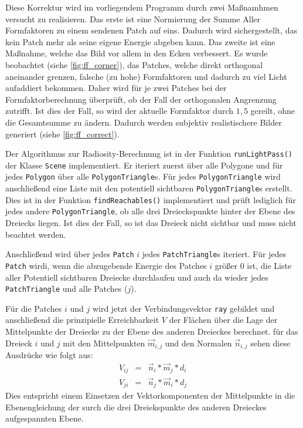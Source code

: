 \documentclass[final,a4paper,11pt,notitlepage,halfparskip]{scrreprt}
\begin{document}
Diese Korrektur wird im vorliegendem Programm durch zwei Maßnamhmen versucht zu
realisieren. Das erste ist eine Normierung der Summe Aller Formfaktoren zu einem
sendenen Patch auf eins. Dadurch wird sichergestellt, das kein Patch mehr als
seine eigene Energie abgeben kann. Das zweite ist eine Maßnahme, welche das Bild
vor allem in den Ecken verbessert. Es wurde beobachtet (siehe \ref{fig:ff_corner}), 
das Patches, welche direkt orthogonal aneinander grenzen, falsche (zu hohe) 
Formfaktoren und dadurch zu viel Licht aufaddiert bekommen. Daher wird für je
zwei Patches bei der Formfaktorberechnung überprüft, ob der Fall der
orthogonalen Angrenzung zutrifft. Ist dies der Fall, so wird der aktuelle
Formfaktor durch $1,5$ gereilt, ohne die Gesamtsumme zu ändern. Dadurch werden
subjektiv realistischere Bilder generiert (siehe \ref{fig:ff_correct}). 

Der Algorithmus zur Radiosity-Berechnung ist in der Funktion
\texttt{runLightPass()} der Klasse \texttt{Scene} implementiert. Er iteriert 
zuerst über alle Polygone und für jedes \texttt{Polygon} über alle 
\texttt{PolygonTriangle}s. Für jedes \texttt{PolygonTriangle} wird 
anschließend eine Liste mit den potentiell sichtbaren \texttt{PolygonTriangle}s
erstellt. Dies ist in der Funktion \texttt{findReachables()} implementiert und
prüft lediglich für jedes andere \texttt{PolygonTriangle}, ob alle drei 
Dreieckspunkte hinter der Ebene des Dreiecks liegen. Ist dies der Fall, so ist 
das Dreieck nicht sichtbar und muss nicht beachtet werden.

Anschließend wird über jedes \texttt{Patch} $i$ jedes \texttt{PatchTriangle}s
iteriert. Für jedes \texttt{Patch} wirdi, wenn die abzugebende Energie des
Patches $i$ größer $0$ ist, die Liste aller Potentiell sichtbaren
Dreiecke durchlaufen und auch da wieder jedes \texttt{PatchTriangle} und alle
Patches ($j$). 

Für die Patches $i$ und $j$ wird jetzt der Verbindungsvektor \texttt{ray}
gebildet und anschließend die prinzipielle Erreichbarkeit $V$ der Flächen 
über die Lage der Mittelpunkte der Dreiecke zu der Ebene des anderen Dreieckes 
berechnet. für das Dreieck $i$ und $j$ mit den Mittelpunkten $\vec{m}_{i,j}$ und
den Normalen $\vec{n}_{i,j}$ sehen diese Ausdrücke wie folgt aus:
\begin{eqnarray*}
  V_{ij} &=& \vec{n}_i * \vec{m}_j * d_i\\
  V_{ji} &=& \vec{n}_j * \vec{m}_i * d_j    
\end{eqnarray*}
Dies entspricht einem Einsetzen der Vektorkomponenten der Mittelpunkte in die
Ebenengleichung der surch die drei Dreiekspunkte des anderen Dreieckes
aufgespannten Ebene.
\end{document}
